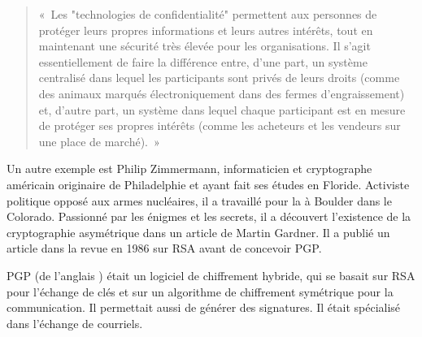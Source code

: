 \begin{quote}
«~Les "technologies de confidentialité" permettent aux personnes de protéger leurs propres informations et leurs autres intérêts, tout en maintenant une sécurité très élevée pour les organisations. Il s'agit essentiellement de faire la différence entre, d'une part, un système centralisé dans lequel les participants sont privés de leurs droits (comme des animaux marqués électroniquement dans des fermes d'engraissement) et, d'autre part, un système dans lequel chaque participant est en mesure de protéger ses propres intérêts (comme les acheteurs et les vendeurs sur une place de marché).~»
\end{quote} %

Un autre exemple est Philip Zimmermann, informaticien et cryptographe américain originaire de Philadelphie et ayant fait ses études en Floride. Activiste politique opposé aux armes nucléaires, il a travaillé pour la  à Boulder dans le Colorado. Passionné par les énigmes et les secrets, il a découvert l'existence de la cryptographie asymétrique dans un article de Martin Gardner. Il a publié un article dans la revue  en 1986 sur RSA avant de concevoir PGP.

PGP (de l'anglais ) était un logiciel de chiffrement hybride, qui se basait sur RSA pour l'échange de clés et sur un algorithme de chiffrement symétrique pour la communication. Il permettait aussi de générer des signatures. Il était spécialisé dans l'échange de courriels.

